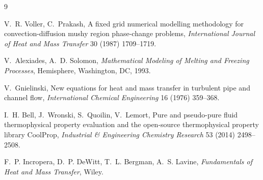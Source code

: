 \documentclass[preprint,12pt]{elsarticle}
\begin{document}
\begin{thebibliography}{9}

V.~R. Voller, C.~Prakash,
A fixed grid numerical modelling methodology for convection-diffusion mushy
region phase-change problems,
\emph{International Journal of Heat and Mass Transfer} 30 (1987) 1709--1719.

V.~Alexiades, A.~D. Solomon,
\emph{Mathematical Modeling of Melting and Freezing Processes},
Hemisphere, Washington, DC, 1993.

V.~Gnielinski,
New equations for heat and mass transfer in turbulent pipe and channel flow,
\emph{International Chemical Engineering} 16 (1976) 359--368.

I.~H. Bell, J.~Wronski, S.~Quoilin, V.~Lemort,
Pure and pseudo-pure fluid thermophysical property evaluation and the
open-source thermophysical property library CoolProp,
\emph{Industrial \& Engineering Chemistry Research} 53 (2014) 2498--2508.

F.~P. Incropera, D.~P. DeWitt, T.~L. Bergman, A.~S. Lavine,
\emph{Fundamentals of Heat and Mass Transfer}, Wiley.

\end{thebibliography}
\end{document}
